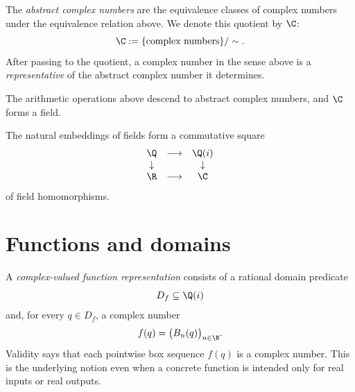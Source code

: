 \begin{definition}\label{def:complex-quotient}
The \emph{abstract complex numbers} are the equivalence classes of complex
numbers under the equivalence relation above.  We denote this quotient by
\(\C\):
\[
  \C:=\{\text{complex numbers}\}/\sim.
\]
After passing to the quotient, a complex number in the sense above is a
\emph{representative} of the abstract complex number it determines.
\end{definition}

\begin{theorem}[\(\C\) is a field]\label{thm:complex-field}
The arithmetic operations above descend to abstract complex numbers, and
\(\C\) forms a field.
\end{theorem}

\begin{theorem}\label{thm:rational-complex-field-square}
The natural embeddings of fields form a commutative square
\[
\begin{array}{ccc}
\Q & \longrightarrow & \Q(i)\\
\downarrow & & \downarrow\\
\R & \longrightarrow & \C
\end{array}
\]
of field homomorphisms.
\end{theorem}

\section{Functions and domains}

\begin{definition}\label{def:function-raw}
A \emph{complex-valued function representation} consists of a rational domain
predicate
\[
  D_f\subseteq \Q(i)
\]
and, for every \(q\in D_f\), a complex number
\[
  f(q)=\bigl(B_n(q)\bigr)_{n\in\N}.
\]
Validity says that each pointwise box sequence \(f(q)\) is a complex number.
This is the underlying notion even when a concrete function is intended only
for real inputs or real outputs.
\end{definition}

